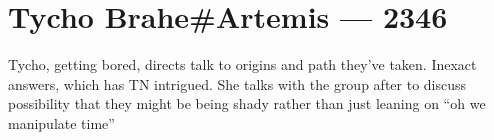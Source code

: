 \hypertarget{tycho-braheartemis-2346}{%
\chapter{Tycho Brahe\#Artemis — 2346}\label{tycho-braheartemis-2346}}

Tycho, getting bored, directs talk to origins and path they've taken. Inexact answers, which has TN intrigued. She talks with the group after to discuss possibility that they might be being shady rather than just leaning on ``oh we manipulate time''
